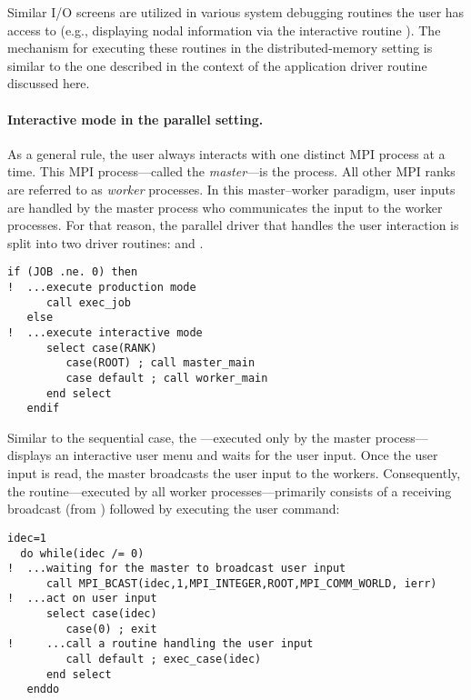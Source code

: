 Similar I/O screens are utilized in various system debugging routines the user has access to (e.g., displaying nodal information via the interactive routine ). The mechanism for executing these routines in the distributed-memory setting is similar to the one described in the context of the application driver routine  discussed here.

\paragraph{Interactive mode in the parallel setting.}
As a general rule, the user always interacts with one distinct MPI process at a time. This MPI process---called the \emph{master}---is the  process. All other MPI ranks are referred to as \emph{worker} processes. In this master--worker paradigm, user inputs are handled by the master process who communicates the input to the worker processes. For that reason, the parallel driver that handles the user interaction is split into two driver routines:  and .
\begin{lstlisting}[caption=Splitting master and worker execution paths., label={lst:master_worker_main}]
   if (JOB .ne. 0) then
!  ...execute production mode
      call exec_job
   else
!  ...execute interactive mode
      select case(RANK)
         case(ROOT) ; call master_main
         case default ; call worker_main
      end select
   endif
\end{lstlisting}

Similar to the sequential case, the ---executed only by the master process---displays an interactive user menu and waits for the user input. Once the user input is read, the master broadcasts the user input to the workers. Consequently, the  routine---executed by all worker processes---primarily consists of a receiving broadcast (from ) followed by executing the user command:

\begin{lstlisting}[caption=Interactive mode in distributed-memory execution., label={lst:interactive_mode_parallel}]
  idec=1
  do while(idec /= 0)
!  ...waiting for the master to broadcast user input
      call MPI_BCAST(idec,1,MPI_INTEGER,ROOT,MPI_COMM_WORLD, ierr)
!  ...act on user input
      select case(idec)
         case(0) ; exit
!     ...call a routine handling the user input
         call default ; exec_case(idec)
      end select
   enddo
\end{lstlisting}

